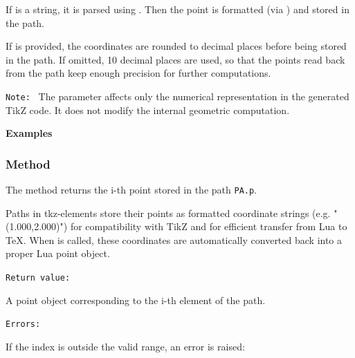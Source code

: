 \medskip

If  is a string, it is parsed using .
Then the point is formatted (via ) and stored
in the path.

\medskip

If  is provided, the coordinates are rounded to 
decimal places before being stored in the path.
If omitted, 10 decimal places are used, so that the points read back from
the path keep enough precision for further computations.

\medskip

\texttt{Note: }
The parameter  affects only the numerical representation in the
generated TikZ code. It does not modify the internal geometric
computation.

\medskip

\textbf{Examples}

\begin{tkzexample}[latex=.35\textwidth]
\end{tkzexample}

\begin{tkzexample}[latex=.35\textwidth]
\end{tkzexample}
\subsubsection{Method }
\label{ssub:method_tkzmeth_path_get}

The method  returns the i-th point stored in the path \texttt{PA.p}.

Paths in tkz-elements store their points as formatted coordinate strings
(e.g. "(1.000,2.000)") for compatibility with TikZ and for efficient
transfer from Lua to \TeX.
When  is called, these coordinates are automatically converted back
into a proper Lua point object.

\medskip
\texttt{Return value: }

A point object corresponding to the i-th element of the path.

\medskip
\texttt{Errors: }

If the index is outside the valid range, an error is raised:



